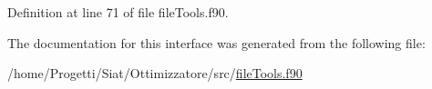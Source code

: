 Definition at line 71 of file file\-Tools.\-f90.



The documentation for this interface was generated from the following file\-:\begin{DoxyCompactItemize}
\item 
/home/\-Progetti/\-Siat/\-Ottimizzatore/src/\hyperlink{file_tools_8f90}{file\-Tools.\-f90}\end{DoxyCompactItemize}
